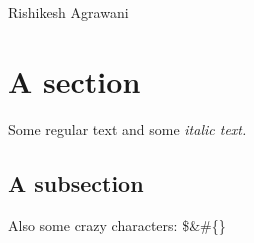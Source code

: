 \documentclass{beamer}%
\begin{document}
%
Rishikesh%
Agrawani%
\normalsize%
\section{A section}%
\label{sec:A section}%
Some regular text and some %
\textit{italic text. }%
\subsection{A subsection}%
\label{subsec:A subsection}%
Also some crazy characters: \$\&\#\{\}

%
\end{document}
